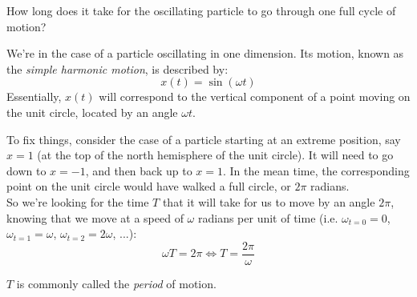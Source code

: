 \documentclass[solutions.tex]{subfiles}
\begin{document}
\maketitle
\begin{exercise} How long does it take for the oscillating
particle to go through one full cycle of motion?
\end{exercise}
We're in the case of a particle oscillating in one dimension.
Its motion, known as the \textit{simple harmonic motion},
is described by:
\[
	x(t) = \sin(\omega t)
\]
Essentially, $x(t)$ will correspond to the vertical component of
a point moving on the unit circle, located by an angle $\omega t$.
\begin{figure}[H]
	\centering
\end{figure}

To fix things, consider the case of a particle starting at an
extreme position, say $x=1$ (at the top of the north hemisphere of
the unit circle). It will need to go down to $x=-1$, and then back
up to $x=1$. In the mean time, the corresponding point on the unit
circle would have walked a full circle, or $2\pi$ radians. \\

So we're looking for the time $T$ that it will take for us
to move by an angle $2\pi$, knowing that we move at a speed
of $\omega$ radians per unit of time (i.e. $\omega_{t=0}=0$,
$\omega_{t=1}=\omega$, $\omega_{t=2}=2\omega$, ...):
\[
	\omega T = 2\pi \Leftrightarrow \boxed{T = \frac{2\pi}\omega}
\]

\begin{remark}$T$ is commonly called the \textit{period} of motion.
\end{remark}
\end{document}
